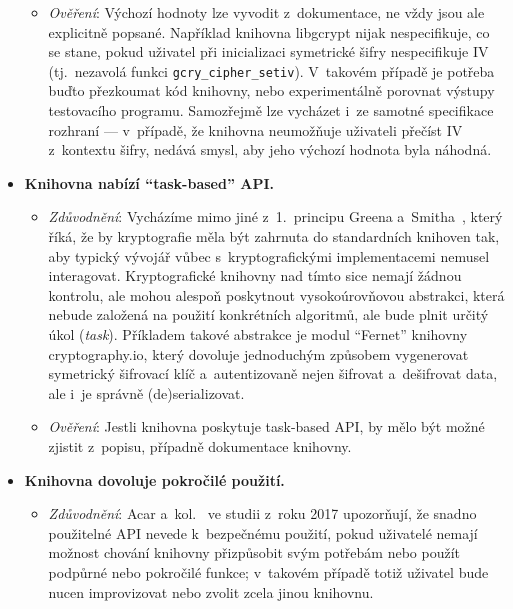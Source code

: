 \begin{itemize}
\begin{itemize}[beginpenalty=10000]
        \item \textit{Ověření}: Výchozí hodnoty lze vyvodit z~dokumentace, ne vždy jsou ale explicitně popsané. Například knihovna libgcrypt nijak nespecifikuje, co se stane, pokud uživatel při inicializaci symetrické šifry nespecifikuje IV (tj.~nezavolá funkci \texttt{gcry\_cipher\_setiv}). V~takovém případě je potřeba buďto přezkoumat kód knihovny, nebo experimentálně porovnat výstupy testovacího programu. Samozřejmě lze vycházet i~ze samotné specifikace rozhraní --- v~případě, že knihovna neumožňuje uživateli přečíst IV z~kontextu šifry, nedává smysl, aby jeho výchozí hodnota byla náhodná.
    \end{itemize}
    
    \item \textbf{Knihovna nabízí ``task-based'' API.} 
    \begin{itemize}[beginpenalty=10000]
        \item \textit{Zdůvodnění}: Vycházíme mimo jiné z~1.~principu Greena a~Smitha~\cite{greensmith}, který říká, že by kryptografie měla být zahrnuta do standardních knihoven tak, aby typický vývojář vůbec s~kryptografickými implementacemi nemusel interagovat. Kryptografické knihovny nad tímto sice nemají žádnou kontrolu, ale mohou alespoň poskytnout vysokoúrovňovou abstrakci, která nebude založená na použití konkrétních algoritmů, ale bude plnit určitý úkol (\textit{task}). Příkladem takové abstrakce je modul ``Fernet'' knihovny cryptography.io, který dovoluje jednoduchým způsobem vygenerovat symetrický šifrovací klíč a~autentizovaně nejen šifrovat a~dešifrovat data, ale i~je správně (de)serializovat.

        \item \textit{Ověření}: Jestli knihovna poskytuje task-based API, by mělo být možné zjistit z~popisu, případně dokumentace knihovny.
    \end{itemize}

    \item \textbf{Knihovna dovoluje pokročilé použití.} 
    \begin{itemize}[beginpenalty=10000]
        \item \textit{Zdůvodnění}: Acar a~kol.~\cite{comparing2017} ve studii z~roku 2017 upozorňují, že snadno použitelné API nevede k~bezpečnému použití, pokud uživatelé nemají možnost chování knihovny přizpůsobit svým potřebám nebo použít podpůrné nebo pokročilé funkce; v~takovém případě totiž uživatel bude nucen improvizovat nebo zvolit zcela jinou knihovnu.


\end{itemize}
\end{itemize}
